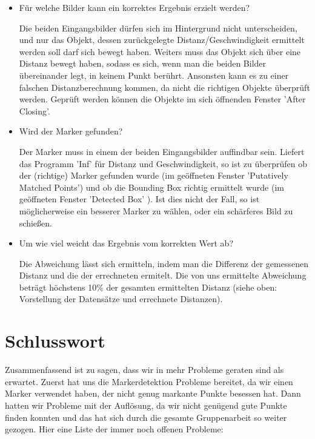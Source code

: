 \documentclass[deutsch]{scrartcl}
\begin{document}
\begin{itemize}
	\item Für welche Bilder kann ein korrektes Ergebnis erzielt werden? 
	
	Die beiden Eingangsbilder dürfen sich im Hintergrund nicht unterscheiden, und nur das Objekt, dessen zurückgelegte Distanz/Geschwindigkeit ermittelt werden soll darf sich bewegt haben. Weiters muss das Objekt sich über eine Distanz bewegt haben, sodass es sich, wenn man die beiden Bilder übereinander legt, in keinem Punkt berührt. Ansonsten kann es zu einer falschen Distanzberechnung kommen, da nicht die richtigen Objekte überprüft werden. Geprüft werden können die Objekte im sich öffnenden Fenster 'After Closing'.
	\item Wird der Marker gefunden? 
	
	Der Marker muss in einem der beiden Eingangsbilder auffindbar sein. Liefert das Programm 'Inf' für Distanz und Geschwindigkeit, so ist zu überprüfen ob der (richtige) Marker gefunden wurde (im geöffneten Fenster 'Putatively Matched Points') und ob die Bounding Box richtig ermittelt wurde (im geöffneten Fenster 'Detected Box' ). Ist dies nicht der Fall, so ist möglicherweise ein besserer Marker zu wählen, oder ein schärferes Bild zu schießen.
	\item Um wie viel weicht das Ergebnis vom korrekten Wert ab? 
	
	Die Abweichung lässt sich ermitteln, indem man die Differenz der gemessenen Distanz und die der errechneten ermitelt. Die von uns ermittelte Abweichung beträgt höchstens 10\% der gesamten ermittelten Distanz (siehe oben: Vorstellung der Datensätze und errechnete Distanzen).
\end{itemize}


\section{Schlusswort}
Zusammenfassend ist zu sagen, dass wir in mehr Probleme geraten sind als erwartet. Zuerst hat uns die Markerdetektion Probleme bereitet, da wir einen Marker verwendet haben, der nicht genug markante Punkte besessen hat. Dann hatten wir Probleme mit der Auflösung, da wir nicht genügend gute Punkte finden konnten und das hat sich durch die gesamte Gruppenarbeit so weiter gezogen. Hier eine Liste der immer noch offenen Probleme:    
\end{document}
